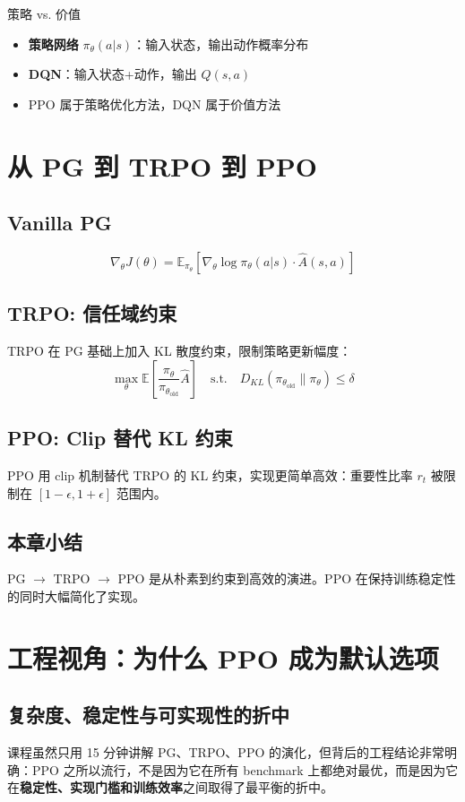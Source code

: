 \documentclass[a4paper]{article}
\begin{document}
\begin{knowledgebox}{策略 vs. 价值}
\begin{itemize}
  \item \textbf{策略网络} $\pi_\theta(a|s)$：输入状态，输出动作概率分布
  \item \textbf{DQN}：输入状态+动作，输出 $Q(s,a)$
  \item PPO 属于策略优化方法，DQN 属于价值方法
\end{itemize}
\end{knowledgebox}

\section{从 PG 到 TRPO 到 PPO}
\subsection{Vanilla PG}
$$\nabla_\theta J(\theta) = \mathbb{E}_{\pi_\theta}\left[\nabla_\theta \log \pi_\theta(a|s) \cdot \hat{A}(s,a)\right]$$

\subsection{TRPO: 信任域约束}
TRPO 在 PG 基础上加入 KL 散度约束，限制策略更新幅度：
$$\max_\theta \mathbb{E}\left[\frac{\pi_\theta}{\pi_{\theta_\text{old}}} \hat{A}\right] \quad \text{s.t.} \quad D_{KL}(\pi_{\theta_\text{old}} \| \pi_\theta) \le \delta$$

\subsection{PPO: Clip 替代 KL 约束}
PPO 用 clip 机制替代 TRPO 的 KL 约束，实现更简单高效：重要性比率 $r_t$ 被限制在 $[1{-}\epsilon, 1{+}\epsilon]$ 范围内。

\subsection{本章小结}
PG $\to$ TRPO $\to$ PPO 是从朴素到约束到高效的演进。PPO 在保持训练稳定性的同时大幅简化了实现。

\section{工程视角：为什么 PPO 成为默认选项}
\subsection{复杂度、稳定性与可实现性的折中}
课程虽然只用 15 分钟讲解 PG、TRPO、PPO 的演化，但背后的工程结论非常明确：PPO 之所以流行，不是因为它在所有 benchmark 上都绝对最优，而是因为它在\textbf{稳定性、实现门槛和训练效率}之间取得了最平衡的折中。
\end{document}

